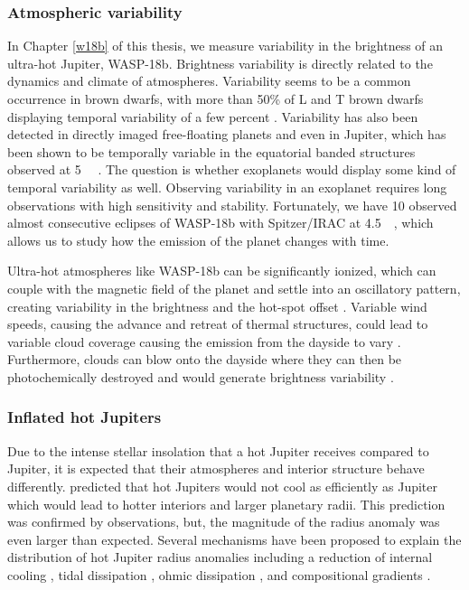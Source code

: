 \subsubsection{Atmospheric variability}
\label{int:sec:variability}

In Chapter \ref{w18b} of this thesis, we measure variability in the brightness of an ultra-hot Jupiter, WASP-18b. Brightness variability is directly related to the dynamics and climate of atmospheres. Variability seems to be a common occurrence in brown dwarfs, with more than 50\% of L and T brown dwarfs displaying temporal variability of a few percent \citep{Metchev2015}. Variability has also been detected in directly imaged free-floating planets \citep{Biller2015} and even in Jupiter, which has been shown to be temporally variable in the equatorial banded structures observed at 5~\um~ \citep{Antunano2019}. The question is whether exoplanets would display some kind of temporal variability as well. Observing variability in an exoplanet requires long observations with high sensitivity and stability. Fortunately, we have 10 observed almost consecutive eclipses of WASP-18b with Spitzer/IRAC at 4.5~\um~, which allows us to study how the emission of the planet changes with time.

Ultra-hot atmospheres like WASP-18b can be significantly ionized, which can couple with the magnetic field of the planet and settle into an oscillatory pattern, creating variability in the brightness and the hot-spot offset \citet{Rogers2017}. Variable wind speeds, causing the advance and retreat of thermal structures, could lead to variable cloud coverage causing the emission from the dayside to vary \citep{Armstrong2016}. Furthermore, clouds can blow onto the dayside where they can then be photochemically destroyed and would generate brightness variability \citep{Jackson2019}.

\subsubsection{Inflated hot Jupiters}

Due to the intense stellar insolation that a hot Jupiter receives compared to Jupiter, it is expected that their atmospheres and interior structure behave differently. \citet{Guillot1996} predicted that hot Jupiters would not cool as efficiently as Jupiter which would lead to hotter interiors and larger planetary radii. This prediction was confirmed by observations, but, the magnitude of the radius anomaly was even larger than expected. Several mechanisms have been proposed to explain the distribution of hot Jupiter radius anomalies including a reduction of internal cooling \citep{Burrows2007a}, tidal dissipation \citep{Bodenheimer2001}, ohmic dissipation \citep{Batygin2010}, and compositional gradients \citep{Chabrier2007, Burrows2007a, Thorngren2016}.

